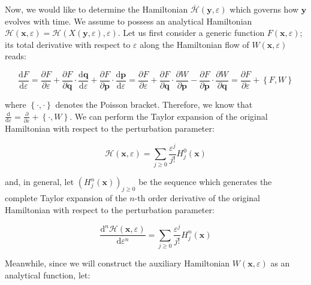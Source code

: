 \vspace*{2.5pt}

\quad Now, we would like to determine the Hamiltonian $\overline{\mathcal{H}}(\mathbf{y},\varepsilon)$ which governs how $\mathbf{y}$ evolves with time. We assume to possess an analytical Hamiltonian $\mathcal{H}(\mathbf{x},\varepsilon)=\mathcal{H}\left(X(\mathbf{y},\varepsilon),\varepsilon\right)$. Let us first consider a generic function $F(\mathbf{x},\varepsilon)$; its total derivative with respect to $\varepsilon$ along the Hamiltonian flow of $W(\mathbf{x},\varepsilon)$ reads:

\begin{equation*}
    \frac{\mathrm{d}F}{\mathrm{d}\varepsilon}=\frac{\partial F}{\partial \varepsilon}+\frac{\partial F}{\partial \mathbf{q}}\cdot \frac{\mathrm{d}\mathbf{q}}{\mathrm{d}\varepsilon}+\frac{\partial F}{\partial \mathbf{p}}\cdot \frac{\mathrm{d}\mathbf{p}}{\mathrm{d}\varepsilon}=\frac{\partial F}{\partial \varepsilon}+\frac{\partial F}{\partial \mathbf{q}}\cdot \frac{\partial W}{\partial \mathbf{p}}-\frac{\partial F}{\partial \mathbf{p}}\cdot \frac{\partial W}{\partial \mathbf{q}}=\frac{\partial F}{\partial \varepsilon}+\left\{F,W\right\}
\end{equation*}

where $\left\{\cdot,\cdot\right\}$ denotes the Poisson bracket. Therefore, we know that $\frac{\mathrm{d}}{\mathrm{d}\varepsilon}=\frac{\partial }{\partial \varepsilon}+\left\{\cdot,W\right\}$. We can perform the Taylor expansion of the original Hamiltonian with respect to the perturbation parameter:

\begin{equation}
    \mathcal{H}(\mathbf{x},\varepsilon)=\sum_{j\geq0}\frac{\varepsilon^j}{j!}H^0_j(\mathbf{x})
\end{equation}

and, in general, let $\left(H^n_j(\mathbf{x})\right)_{j\geq0}$ be the sequence which generates the complete Taylor expansion of the $n$-th order derivative of the original Hamiltonian with respect to the perturbation parameter:

\begin{equation}
    \frac{\mathrm{d}^n\mathcal{H}(\mathbf{x},\varepsilon)}{\mathrm{d}\varepsilon^n}=\sum_{j\geq0}\frac{\varepsilon^j}{j!}H^n_j(\mathbf{x})
\end{equation}

Meanwhile, since we will construct the auxiliary Hamiltonian $W(\mathbf{x},\varepsilon)$ as an analytical function, let:

